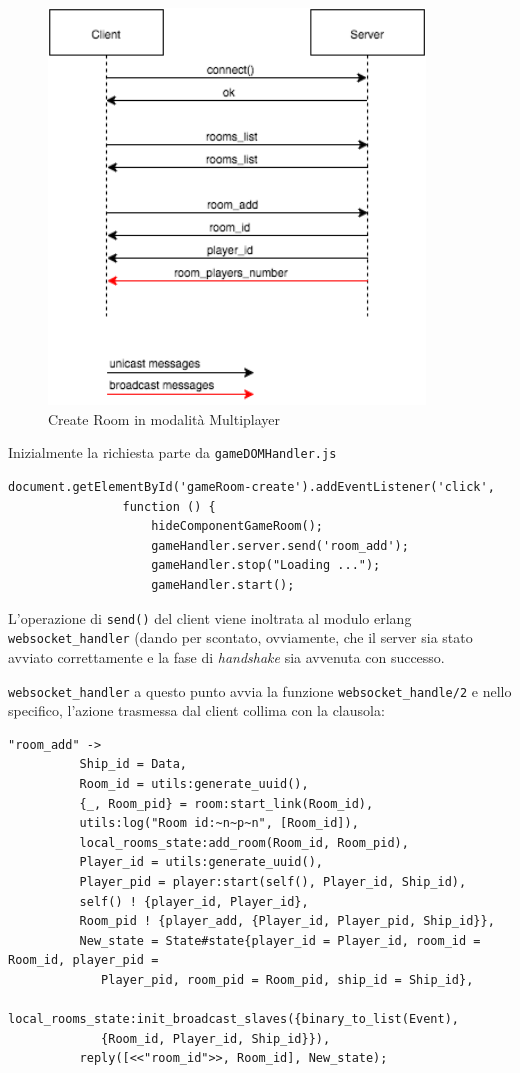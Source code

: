 \documentclass[paper=a4, fontsize=11pt]{scrartcl} %
\numberwithin{equation}{section} %
\numberwithin{figure}{section} %
\numberwithin{table}{section} %
\begin{document}
\begin{figure}
\centering
\includegraphics[width=10cm]{MultiplayerCreateRoom}
\caption{Create Room in modalità Multiplayer}
\label{CreateRoom}
\end{figure}


Inizialmente la richiesta parte da \texttt{gameDOMHandler.js}

\begin{lstlisting}[basicstyle=\footnotesize]
document.getElementById('gameRoom-create').addEventListener('click',
				function () {
                    hideComponentGameRoom();
                    gameHandler.server.send('room_add');
                    gameHandler.stop("Loading ...");
                    gameHandler.start();
\end{lstlisting}

L'operazione di \texttt{send()} del client viene inoltrata al modulo erlang \texttt{websocket\_handler} (dando per scontato, ovviamente, che il server sia stato avviato correttamente e la fase di \textit{handshake} sia avvenuta con successo.

\texttt{websocket\_handler} a questo punto avvia la funzione \texttt{websocket\_handle/2} e nello specifico, l'azione trasmessa dal client collima con la clausola:
\begin{lstlisting}[basicstyle=\footnotesize]
"room_add" ->
          Ship_id = Data,
          Room_id = utils:generate_uuid(),
          {_, Room_pid} = room:start_link(Room_id),
          utils:log("Room id:~n~p~n", [Room_id]),
          local_rooms_state:add_room(Room_id, Room_pid),
          Player_id = utils:generate_uuid(),
          Player_pid = player:start(self(), Player_id, Ship_id),
          self() ! {player_id, Player_id},
          Room_pid ! {player_add, {Player_id, Player_pid, Ship_id}},
          New_state = State#state{player_id = Player_id, room_id = Room_id, player_pid =
          	 Player_pid, room_pid = Room_pid, ship_id = Ship_id},
          local_rooms_state:init_broadcast_slaves({binary_to_list(Event), 
          	 {Room_id, Player_id, Ship_id}}),
          reply([<<"room_id">>, Room_id], New_state);
\end{lstlisting}
\end{document}
